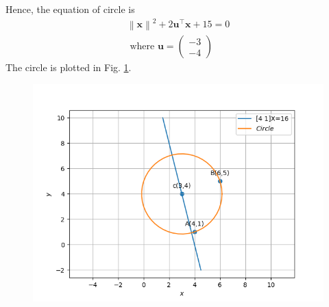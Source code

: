 \documentclass[12pt]{article}
\providecommand{\norm}[1]{\left\lVert#1\right\rVert}
\newcommand{\myvec}[1]{\ensuremath{\begin{pmatrix}#1\end{pmatrix}}}
\let\vec\mathbf
\begin{document}
Hence, the equation of circle is
\begin{align}
	\norm{\vec{x}}^2 +2\vec{u}^\top \vec{x}+15 = 0\\
	\text{ where } \vec{u} = \myvec{-3\\-4}
\end{align}
The circle is plotted in Fig. \ref{fig:chapters/11/11/1/10Fig1}.
\begin{figure}[!h]
	\begin{center} 
	    \includegraphics[width=\columnwidth]{chapters/11/11/1/10/figs/circ2}
	\end{center}
\caption{}
\label{fig:chapters/11/11/1/10Fig1}
\end{figure}
\end{document}
